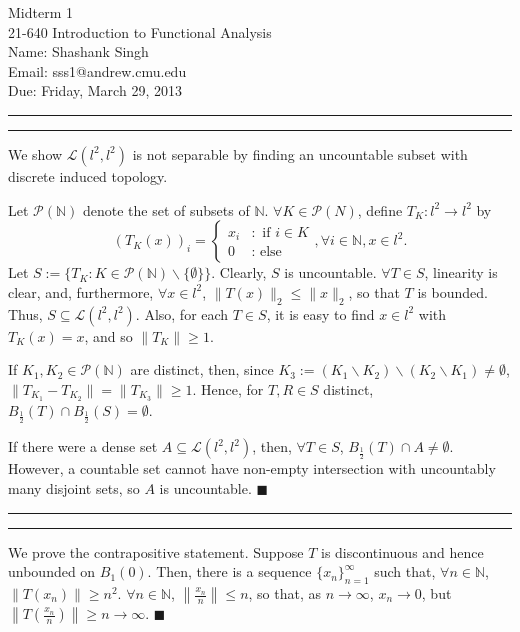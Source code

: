 \documentclass[11pt]{article}
\makeatletter
\newcounter{questionCounter}
\newcounter{partCounter}[questionCounter]
\newenvironment{question}[2][\arabic{questionCounter}]{%
    \setcounter{partCounter}{0}%
    \vspace{.25in} \hrule \vspace{0.5em}%
        \noindent{\bf #2}%
    \vspace{0.8em} \hrule \vspace{.10in}%
    \addtocounter{questionCounter}{1}%
}{}
\newcommand{\myname}{Shashank Singh}
\newcommand{\myandrew}{sss1@andrew.cmu.edu}
\newcommand{\myclass}{21-640 Introduction to Functional Analysis}
\newcommand{\myhwnum}{1}
\newcommand{\duedate}{Friday, March 29, 2013}
\renewcommand{\qed}{\quad $\blacksquare$}
\newcommand{\sminus}{\backslash}
\newcommand{\N}{\mathbb{N}} %
\renewcommand{\L}{\mathcal{L}} %
\newcommand{\pow}[1]{\mathcal{P}\left(#1\right)} %
\makeatother
\begin{document}
\thispagestyle{plain}

{\Large Midterm \myhwnum} \\
\myclass \\
Name: \myname \\
Email: \myandrew \\
Due: \duedate

\begin{question}{Problem 1}
We show $\L(l^2,l^2)$ is not separable by finding an uncountable subset
with discrete induced topology.

Let $\pow{\N}$ denote the set of subsets of $\N$. $\forall K \in \pow{N}$,
define $T_K : l^2 \rightarrow l^2$ by
\[(T_K(x))_i =
    \left\{
        \begin{array}{cl}
            x_i & : \mbox{ if } i \in K \\
            0   & : \mbox{ else }
        \end{array}
    \right.,
\forall i \in \N, x \in l^2.\]
Let $S := \{T_K : K \in \pow{\N} \sminus \{\emptyset\}\}$. Clearly, $S$ is
uncountable. $\forall T \in S$, linearity is clear, and, furthermore,
$\forall x \in l^2$, $\|T(x)\|_2 \leq \|x\|_2$, so that $T$ is bounded. Thus,
$S \subseteq \L(l^2,l^2)$. Also, for each $T \in S$, it is easy to
find $x \in l^2$ with $T_K(x) = x$, and so $\|T_K\| \geq 1$.

If $K_1,K_2 \in \pow{\N}$ are distinct, then, since
$K_3 := (K_1 \sminus K_2) \sminus (K_2 \sminus K_1) \neq \emptyset$,
$\|T_{K_1} - T_{K_2}\| = \|T_{K_3}\| \geq 1$. Hence, for $T,R \in S$ distinct,
$B_{\frac12}(T) \cap B_{\frac12}(S) = \emptyset$.

If there were a dense set $A \subseteq \L(l^2,l^2)$, then, $\forall T \in S$,
$B_{\frac12}(T) \cap A \neq \emptyset$. However, a countable set cannot have
non-empty intersection with uncountably many disjoint sets, so $A$ is
uncountable. \qed
\end{question}

\begin{question}{Problem 2}
We prove the contrapositive statement. Suppose $T$ is discontinuous and
hence unbounded on $B_1(0)$. Then, there is a sequence
$\{x_n\}_{n = 1}^{\infty}$ such that, $\forall n \in \N$,
$\|T(x_n)\| \geq n^2$. $\forall n \in \N$,
$\left\| \frac{x_n}{n} \right\| \leq n$, so that, as $n \rightarrow \infty$,
$x_n \rightarrow 0$, but
$\left \|T\left( \frac{x_n}{n} \right) \right\| \geq n \rightarrow \infty$.
\qed
\vspace{-0.1in}
\end{question}
\end{document}
